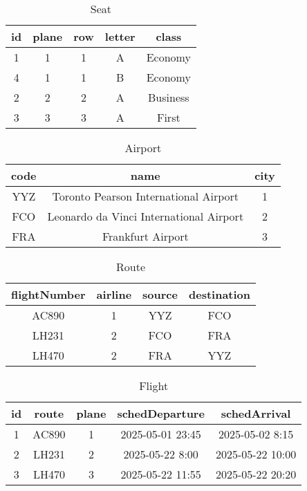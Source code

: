 \begin{table}[h!]
\centering         
\begin{tabular}{|c|c|c|c|c|} 
\hline             
id & plane & row & letter & class \\ 
\hline
1 & 1 & 1 & A & Economy\\ 
\hline
4 & 1 & 1 & B & Economy\\ 
\hline
2 & 2 & 2 & A & Business\\
\hline
3 & 3 & 3 & A & First\\ 
\hline
\end{tabular}
\caption{Seat} 
\label{tab:example} 
\end{table}

\begin{table}[h!]
\centering         
\begin{tabular}{|c|c|c|} 
\hline             
code & name & city \\ 
\hline
YYZ & Toronto Pearson International Airport & 1 \\ 
\hline
FCO & Leonardo da Vinci International Airport & 2 \\
\hline
FRA & Frankfurt Airport & 3 \\ 
\hline
\end{tabular}
\caption{Airport} 
\label{tab:example} 
\end{table}

\newpage

\begin{table}[h!]
\centering         
\begin{tabular}{|c|c|c|c|} 
\hline             
flightNumber & airline & source & destination \\ 
\hline
AC890 & 1 & YYZ & FCO\\ 
\hline
LH231 & 2 & FCO & FRA\\
\hline
LH470 & 2 & FRA & YYZ\\ 
\hline
\end{tabular}
\caption{Route} 
\label{tab:example} 
\end{table}

\begin{table}[h!]
\centering         
\begin{tabular}{|c|c|c|c|c|} 
\hline             
id & route & plane & schedDeparture & schedArrival \\ 
\hline
1 & AC890 & 1 & 2025-05-01 23:45 & 2025-05-02 8:15\\ 
\hline
2 & LH231 & 2 & 2025-05-22 8:00 & 2025-05-22 10:00\\
\hline
3 & LH470 & 3 & 2025-05-22 11:55 & 2025-05-22 20:20\\ 
\hline
\end{tabular}
\caption{Flight} 
\label{tab:example} 
\end{table}

